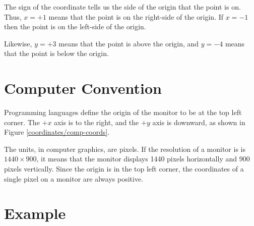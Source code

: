 
The sign of the coordinate tells us the side of the origin that the point is on. Thus, $x=+1$ means that the point is on the right-side of the origin. If $x=-1$ then the point is on the left-side of the origin.

Likewise, $y=+3$ means that the point is above the origin, and $y=-4$ means that the point is below the origin.


\section*{Computer Convention}

Programming languages define the origin of the monitor to be at the top left corner. The $+x$ axis is to the right, and the $+y$ axis is downward, as shown in Figure \ref{coordinates/comp-coords}. 

The units, in computer graphics, are pixels. If the resolution of a monitor is is $1440 \times 900$, it means that the monitor displays 1440 pixels horizontally and 900 pixels vertically. Since the origin is in the top left corner, the coordinates of a single pixel on a monitor are always positive.


\section*{Example}



\pagebreak

